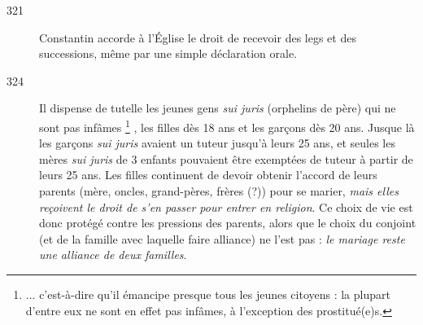 \begin{description}
\item[321] Constantin accorde à l'Église le droit de recevoir des legs et des successions, même par une simple déclaration orale. 

\item[324] Il dispense de tutelle les jeunes gens \emph{sui juris} (orphelins de père) qui ne sont pas infâmes%
\footnote{... c'est-à-dire qu'il émancipe presque tous les jeunes citoyens : la plupart d'entre eux ne sont en effet pas infâmes, à l'exception des prostitué(e)s.}%
, les filles dès 18 ans et les garçons dès 20 ans. Jusque là les garçons \emph{sui juris} avaient un tuteur jusqu'à leurs 25 ans, et seules les mères \emph{sui juris} de 3 enfants pouvaient être exemptées de tuteur à partir de leurs 25 ans. Les filles continuent de devoir obtenir l'accord de leurs parents (mère, oncles, grand-pères, frères (?)) pour se marier, \emph{mais elles reçoivent le droit de s'en passer pour entrer en religion}. Ce choix de vie est donc protégé contre les pressions des parents, alors que le choix du conjoint (et de la famille avec laquelle faire alliance) ne l'est pas : \emph{le mariage reste une alliance de deux familles}.


\end{description}
